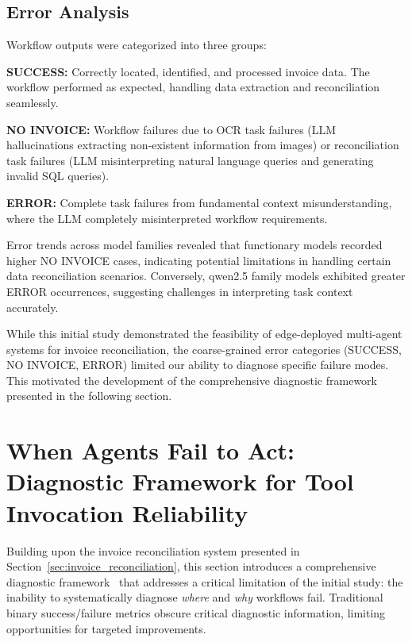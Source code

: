 \subsection{Error Analysis}

Workflow outputs were categorized into three groups:

\textbf{SUCCESS:} Correctly located, identified, and processed invoice data. The workflow performed as expected, handling data extraction and reconciliation seamlessly.

\textbf{NO INVOICE:} Workflow failures due to OCR task failures (LLM hallucinations extracting non-existent information from images) or reconciliation task failures (LLM misinterpreting natural language queries and generating invalid SQL queries).

\textbf{ERROR:} Complete task failures from fundamental context misunderstanding, where the LLM completely misinterpreted workflow requirements.

Error trends across model families revealed that functionary models recorded higher NO INVOICE cases, indicating potential limitations in handling certain data reconciliation scenarios. Conversely, qwen2.5 family models exhibited greater ERROR occurrences, suggesting challenges in interpreting task context accurately.

While this initial study demonstrated the feasibility of edge-deployed multi-agent systems for invoice reconciliation, the coarse-grained error categories (SUCCESS, NO INVOICE, ERROR) limited our ability to diagnose specific failure modes. This motivated the development of the comprehensive diagnostic framework presented in the following section.


\section{When Agents Fail to Act: Diagnostic Framework for Tool Invocation Reliability}
\label{sec:diagnostic_framework}

Building upon the invoice reconciliation system presented in Section~\ref{sec:invoice_reconciliation}, this section introduces a comprehensive diagnostic framework~\cite{huang2026when} that addresses a critical limitation of the initial study: the inability to systematically diagnose \textit{where} and \textit{why} workflows fail. Traditional binary success/failure metrics obscure critical diagnostic information, limiting opportunities for targeted improvements.


